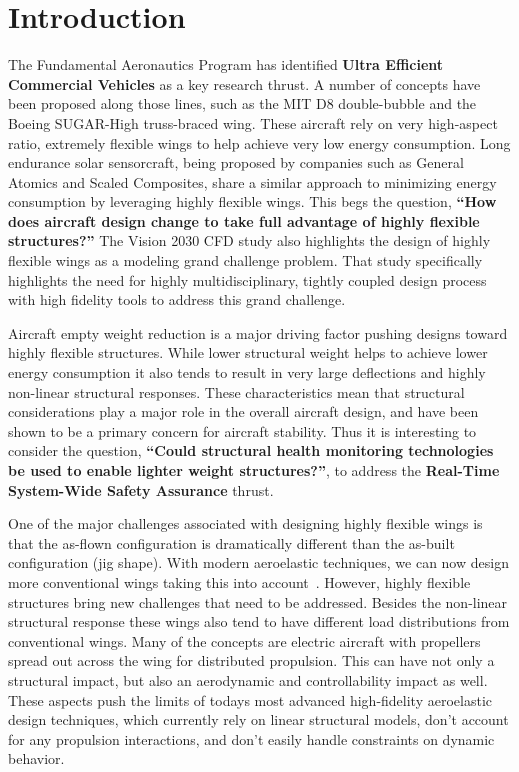 \documentclass[]{aiaa-tc}
\begin{document}
  \newpage

  \section{Introduction}

    The Fundamental Aeronautics Program has identified \textbf{Ultra Efficient Commercial Vehicles} as 
    a key research thrust. A number of concepts have been proposed along those lines, such as 
    the MIT D8 double­-bubble and the Boeing SUGAR­-High truss­-braced wing. These aircraft rely on 
    very high­-aspect ratio, extremely flexible wings to help achieve very low energy consumption. 
    Long endurance solar sensorcraft, being proposed by companies such as General Atomics and 
    Scaled Composites, share a similar approach to minimizing energy consumption by leveraging highly 
    flexible wings. This begs the question, \textbf{``How does aircraft design change to take full 
    advantage of highly flexible structures?''} The Vision 2030 CFD study also highlights the 
    design of highly flexible wings as a modeling grand challenge problem. That study specifically 
    highlights the need for highly multidisciplinary, tightly coupled design process with high 
    fidelity tools to address this grand challenge.

    Aircraft empty weight reduction is a major driving factor pushing designs toward highly flexible structures. 
    While lower structural weight helps to achieve lower energy consumption it also tends to result in very large 
    deflections and highly non-linear structural responses. These characteristics mean that 
    structural considerations play a major role in the overall aircraft design, and have been shown to be a primary 
    concern for aircraft stability\cite{heliosfailure_2007}. Thus it is interesting to consider the question, 
    \textbf{``Could structural health monitoring technologies be used to enable lighter 
    weight structures?''}, to address the \textbf{Real­-Time System­-Wide Safety Assurance} thrust. 

    One of the major challenges associated with designing highly flexible wings is that the as-flown configuration 
    is dramatically different than the as-built configuration (jig shape). With modern aeroelastic techniques, 
    we can now design more conventional wings taking this into account~\cite{Kennedy:2014:tacs-tripan, Kennedy:2012:CMC, 
      Kennedy:2014:High-aspect-ratio}. However, highly flexible
    structures bring new challenges that need to be addressed. Besides the non-linear structural 
    response these wings also tend to have different load distributions from conventional wings. Many of the concepts 
    are electric aircraft with propellers spread out across the wing for distributed propulsion. This can have not only a 
    structural impact, but also an aerodynamic and controllability impact as well. These aspects push the 
    limits of todays most advanced high-fidelity aeroelastic design techniques, which currently rely on linear structural 
    models, don't account for any propulsion interactions, and don't easily handle constraints on dynamic behavior. 
\end{document}
